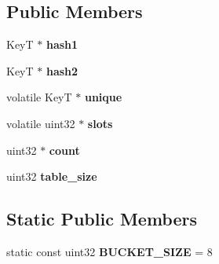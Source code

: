 \subsection*{Public Members}
\begin{DoxyCompactItemize}
\item 
\mbox{\label{structcugar_1_1cuda_1_1_sync_free_double_key_hash_map_a250cf43297036f9d1e7f0a289cf2e281}} 
KeyT $\ast$ {\bfseries hash1}
\item 
\mbox{\label{structcugar_1_1cuda_1_1_sync_free_double_key_hash_map_aa4897f59cf07307ddcd0143b9f2502b9}} 
KeyT $\ast$ {\bfseries hash2}
\item 
\mbox{\label{structcugar_1_1cuda_1_1_sync_free_double_key_hash_map_acee9c716674fd1002a90a28445d74ca1}} 
volatile KeyT $\ast$ {\bfseries unique}
\item 
\mbox{\label{structcugar_1_1cuda_1_1_sync_free_double_key_hash_map_ad01db27e68c322fc61a95d83af12c198}} 
volatile uint32 $\ast$ {\bfseries slots}
\item 
\mbox{\label{structcugar_1_1cuda_1_1_sync_free_double_key_hash_map_a3e9d7afbe5cbd7f437462db202ec2781}} 
uint32 $\ast$ {\bfseries count}
\item 
\mbox{\label{structcugar_1_1cuda_1_1_sync_free_double_key_hash_map_a0f884b66cec7f2ae4068921a2ec282b3}} 
uint32 {\bfseries table\+\_\+size}
\end{DoxyCompactItemize}
\subsection*{Static Public Members}
\begin{DoxyCompactItemize}
\item 
\mbox{\label{structcugar_1_1cuda_1_1_sync_free_double_key_hash_map_a3e908119f2f67d4c92f2cd27cb87fe4d}} 
static const uint32 {\bfseries B\+U\+C\+K\+E\+T\+\_\+\+S\+I\+ZE} = 8
\end{DoxyCompactItemize}


